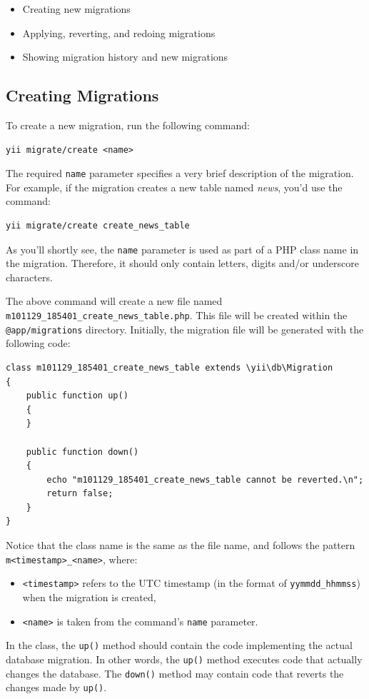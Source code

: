 \begin{itemize}
\item Creating new migrations
\item Applying, reverting, and redoing migrations
\item Showing migration history and new migrations
\end{itemize}
\subsection{Creating Migrations}
To create a new migration, run the following command:

\begin{lstlisting}
yii migrate/create <name>
\end{lstlisting}
The required \lstinline|name| parameter specifies a very brief description of the migration. For example, if the migration creates a new table named \textit{news}, you'd use the command:

\begin{lstlisting}
yii migrate/create create_news_table
\end{lstlisting}
As you'll shortly see, the \lstinline|name| parameter
is used as part of a PHP class name in the migration. Therefore, it should only contain letters,
digits and/or underscore characters.

The above command will create a new
file named \lstinline|m101129_185401_create_news_table.php|. This file will be created within the \lstinline|@app/migrations| directory. Initially, the migration file will be generated with the following code:

\lstset{language=php}\begin{lstlisting}
class m101129_185401_create_news_table extends \yii\db\Migration
{
    public function up()
    {
    }

    public function down()
    {
        echo "m101129_185401_create_news_table cannot be reverted.\n";
        return false;
    }
}
\end{lstlisting}
Notice that the class name is the same as the file name, and follows the pattern
\lstinline|m<timestamp>_<name>|, where:

\begin{itemize}
\item \lstinline|<timestamp>| refers to the UTC timestamp (in the
format of \lstinline|yymmdd_hhmmss|) when the migration is created,
\item \lstinline|<name>| is taken from the command's \lstinline|name| parameter.
\end{itemize}
In the class, the \lstinline|up()| method should contain the code implementing the actual database
migration. In other words, the \lstinline|up()| method executes code that actually changes the database. The \lstinline|down()| method may contain code that reverts the changes made by \lstinline|up()|.

